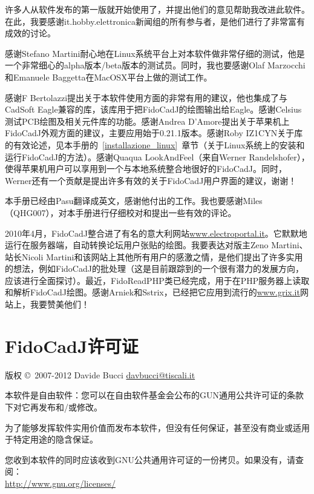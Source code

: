 \documentclass[10pt,a4paper,twoside]{scrreprt}
\begin{document}
许多人从软件发布的第一版就开始使用了，并提出他们的意见帮助我改进此软件。在此，我要感谢it.hobby.elettronica新闻组的所有参与者，是他们进行了非常富有成效的讨论。

感谢Stefano Martini耐心地在Linux系统平台上对本软件做非常仔细的测试，他是一个非常细心的alpha版本/beta版本的测试员。同时，我也要感谢Olaf Marzocchi和Emanuele Baggetta在MacOSX平台上做的测试工作。

感谢F Bertolazzi提出关于本软件使用方面的非常有用的建议，他也集成了与CadSoft Eagle兼容的库，该库用于把FidoCadJ的绘图输出给Eagle。感谢Celsius测试PCB绘图及相关元件库的功能。感谢Andrea D'Amore提出关于苹果机上FidoCadJ外观方面的建议，主要应用始于0.21.1版本。感谢Roby IZ1CYN关于库的有效论述，见本手册的~\ref{installazione_linux}~章节（关于Linux系统上的安装和运行FidoCadJ的方法）。感谢Quaqua LookAndFeel（来自Werner Randelshofer），使得苹果机用户可以享用到一个与本地系统整合地很好的FidoCadJ。同时，Werner还有一个贡献是提出许多有效的关于FidoCadJ用户界面的建议，谢谢！

本手册已经由Pasu翻译成英文，感谢他付出的工作。我也要感谢Miles（QHG007），对本手册进行仔细校对和提出一些有效的评论。

2010年4月，FidoCadJ整合进了有名的意大利网站\href{www.electroportal.it}{www.electroportal.it}。它默默地运行在服务器端，自动转换论坛用户张贴的绘图。我要表达对版主Zeno Martini、站长Nicoli Martini和该网站上其他所有用户的感激之情，是他们提出了许多实用的想法，例如FidoCadJ的批处理（这是目前跟踪到的一个很有潜力的发展方向，应该进行全面探讨）。最近，FidoReadPHP类已经完成，用于在PHP服务器上读取和解析FidoCadJ绘图。感谢Arniek和Sstrix，已经把它应用到流行的\href{www.grix.it}{www.grix.it}网站上，我要赞美他们！

\clearpage{}
\chapter*{FidoCadJ许可证}

版权 \copyright\ 2007-2012 Davide Bucci \href{mailto:davbucci@tiscali.it}{davbucci@tiscali.it}

本软件是自由软件：您可以在自由软件基金会公布的GUN通用公共许可证的条款下对它再发布和/或修改。

为了能够发挥软件实用价值而发布本软件，但没有任何保证，甚至没有商业或适用于特定用途的隐含保证。

您收到本软件的同时应该收到GNU公共通用许可证的一份拷贝。如果没有，请查阅：\\ \href{http://www.gnu.org/licenses/}{http://www.gnu.org/licenses/}
\end{document}
